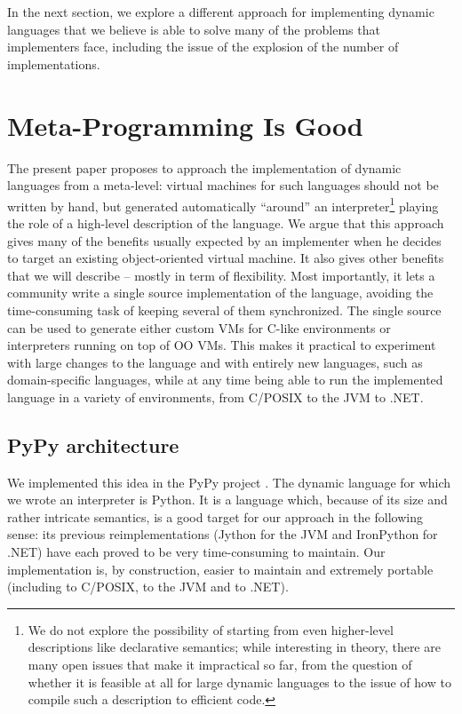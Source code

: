 \documentclass{llncs}
\begin{document}
In the next section, we explore a different approach for implementing
dynamic languages that we believe is able to solve many of the problems that
implementers face, including the issue of the explosion of the number
of implementations.

\section{Meta-Programming Is Good}
\label{sect:metaprogramming}

The present paper proposes to approach the implementation of dynamic
languages from a meta-level: virtual machines for such languages should
not be written by hand, but generated automatically ``around'' an
interpreter\footnote
{
We do not explore the possibility of starting from even
higher-level descriptions like declarative semantics; while interesting in
theory, there are many open issues that make it impractical so far, from
the question of whether it is feasible at all for large dynamic languages
to the issue of how to compile such a description to efficient code.
}
playing the role of a high-level description of the language.  We
argue that this approach gives many of the benefits usually expected by
an implementer when he decides to target an existing object-oriented
virtual machine.  It also gives other benefits that we will describe --
mostly in term of flexibility.  Most importantly, it lets a
community write a single source implementation of the language, avoiding
the time-consuming task of keeping several of them synchronized.  The single
source can be used to generate either custom VMs for C-like
environments or interpreters running on top of OO VMs.  This makes it
practical to experiment with large changes to the language and with
entirely new languages, such as domain-specific languages, while at any
time being able to run the implemented language in a variety of
environments, from C/POSIX to the JVM to .NET.

\subsection{PyPy architecture}

We implemented this idea in the PyPy project \cite{pypy}.  The dynamic language
for which we wrote an interpreter is Python.  It is a language which,
because of its size and rather intricate semantics, is a good target for
our approach in the following sense: its previous reimplementations
(Jython for the JVM and IronPython for .NET) have each proved to be very
time-consuming to maintain.  Our implementation is, by construction,
easier to maintain and extremely portable (including to C/POSIX, to the
JVM and to .NET).
\end{document}

